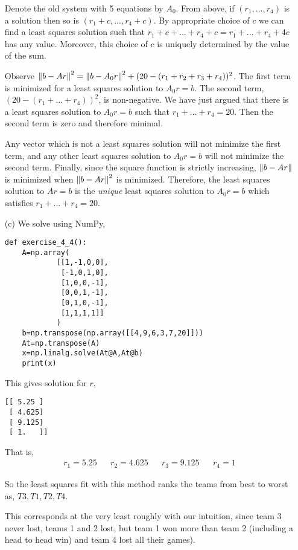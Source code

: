 \documentclass[10pt]{article}
\begin{document}
\begin{solution}[Solution]
\begin{enumerate}
        Denote the old system with 5 equations by \( A_0 \). From above, if \( (r_1, ..., r_4) \) is a solution then so is \( (r_1+c, ..., r_4+c) \). By appropriate choice of \( c \) we can find a least squares solution such that \( r_1+c+...+r_4+c = r_1+...+r_4+4c\) has any value. Moreover, this choice of \( c \) is uniquely determined by the value of the sum.
        
        Observe \( \left\lVert b-Ar\right\rVert^2 = \left\lVert b-A_0r\right\rVert^2 + (20-(r_1+r_2+r_3+r_4))^2 \). The first term is minimized for a least squares solution to \( A_0r=b \). The second term, \( (20-(r_1+...+r_4))^2 \), is non-negative. We have just argued that there is a least squares solution to \( A_0r=b \) such that \( r_1+...+r_4=20 \). Then the second term is zero and therefore minimal.

        Any vector which is not a least squares solution will not minimize the first term, and any other least squares solution to \( A_0r=b \) will not minimize the second term. Finally, since the square function is strictly increasing, \( \left\lVert b-Ar\right\rVert \) is minimized when \( \left\lVert b-Ar\right\rVert^2 \) is minimized. Therefore, the least squares solution to \( Ar=b \) is the \textit{unique} least squares solution to \( A_0r=b \) which satisfies \( r_1+...+r_4=20 \).


    \item[(c)]
We solve using NumPy,
\begin{lstlisting}
def exercise_4_4():
    A=np.array(
            [[1,-1,0,0],
             [-1,0,1,0],
             [1,0,0,-1],
             [0,0,1,-1],
             [0,1,0,-1],
             [1,1,1,1]]
            )
    b=np.transpose(np.array([[4,9,6,3,7,20]]))
    At=np.transpose(A)
    x=np.linalg.solve(At@A,At@b)
    print(x)
\end{lstlisting}

        This gives solution for \( r \),
\begin{lstlisting}
[[ 5.25 ]
 [ 4.625]
 [ 9.125]
 [ 1.   ]]
\end{lstlisting}

        That is,
        \begin{align*}
            r_1=5.25 && r_2=4.625 && r_3=9.125 && r_4=1 
        \end{align*}

        So the least squares fit with this method ranks the teams from best to worst as, \( T3, T1, T2, T4 \).

        This corresponds at the very least roughly with our intuition, since team 3 never lost, teams 1 and 2 lost, but team 1 won more than team 2 (including a head to head win) and team 4 lost all their games).

\end{enumerate}

\end{solution}
\end{document}

